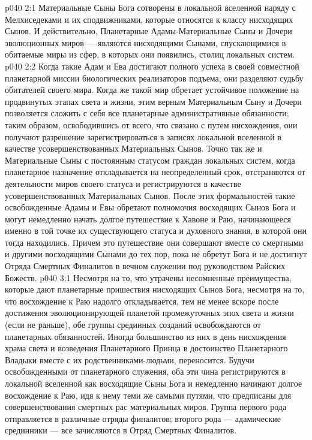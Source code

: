 \vs p040 2:1 Материальные Сыны Бога сотворены в локальной вселенной наряду с Мелхиседеками и их сподвижниками, которые относятся к классу нисходящих Сынов. И действительно, Планетарные Адамы\hyp{}Материальные Сыны и Дочери эволюционных миров --- являются нисходящими Сынами, спускающимися в обитаемые миры из сфер, в которых они появились, столиц локальных систем.
\vs p040 2:2 Когда такие Адам и Ева достигают полного успеха в своей совместной планетарной миссии биологических реализаторов подъема, они разделяют судьбу обитателей своего мира. Когда же такой мир обретает устойчивое положение на продвинутых этапах света и жизни, этим верным Материальным Сыну и Дочери позволяется сложить с себя все планетарные административные обязанности; таким образом, освободившись от всего, что связано с путем нисхождения, они получают разрешение зарегистрироваться в записях локальной вселенной в качестве усовершенствованных Материальных Сынов. Точно так же и Материальные Сыны с постоянным статусом граждан локальных систем, когда планетарное назначение откладывается на неопределенный срок, отстраняются от деятельности миров своего статуса и регистрируются в качестве усовершенствованных Материальных Сынов. После этих формальностей такие освобожденные Адамы и Евы обретают полномочия восходящих Сынов Бога и могут немедленно начать долгое путешествие к Хавоне и Раю, начинающееся именно в той точке их существующего статуса и духовного знания, в которой они тогда находились. Причем это путешествие они совершают вместе со смертными и другими восходящими Сынами до тех пор, пока не обретут Бога и не достигнут Отряда Смертных Финалитов в вечном служении под руководством Райских Божеств.
\vs p040 3:1 Несмотря на то, что утрачены несомненные преимущества, которые дают планетарные пришествия нисходящих Сынов Бога, несмотря на то, что восхождение к Раю надолго откладывается, тем не менее вскоре после достижения эволюционирующей планетой промежуточных эпох света и жизни (если не раньше), обе группы срединных созданий освобождаются от планетарных обязанностей. Иногда большинство из них в день нисхождения храма света и возведения Планетарного Принца в достоинство Планетарного Владыки вместе с их родственниками\hyp{}людьми, переносится. Будучи освобожденными от планетарного служения, оба эти чина регистрируются в локальной вселенной как восходящие Сыны Бога и немедленно начинают долгое восхождение к Раю, идя к нему теми же самыми путями, что предписаны для совершенствования смертных рас материальных миров. Группа первого рода отправляется в различные отряды финалитов; второго рода --- адамические срединники --- все зачисляются в Отряд Смертных Финалитов.
